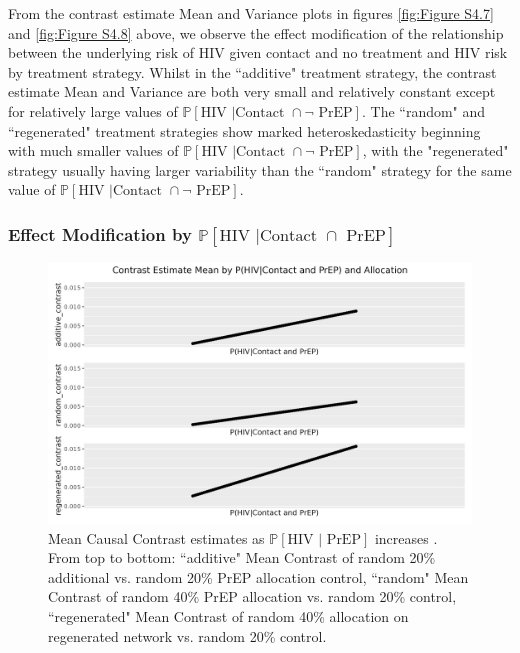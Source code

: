 \documentclass{article}
\theoremstyle{definition}
\begin{document}
From the contrast estimate Mean and Variance plots in figures \ref{fig:Figure S4.7} and \ref{fig:Figure S4.8} above, we observe the effect modification of the relationship between the underlying risk of HIV given contact and no treatment and HIV risk by treatment strategy. Whilst in the ``additive" treatment strategy, the contrast estimate Mean and Variance are both very small and relatively constant except for relatively large values of $\mathbb{P}\left[\text{HIV } \vert \text {Contact } \cap \neg \text{ PrEP}\right]$. The ``random" and ``regenerated" treatment strategies show marked heteroskedasticity beginning with much smaller values of $\mathbb{P}\left[\text{HIV } \vert \text {Contact } \cap \neg \text{ PrEP}\right]$, with the "regenerated" strategy usually having larger variability than the ``random" strategy for the same value of $\mathbb{P}\left[\text{HIV } \vert \text {Contact } \cap \neg \text{ PrEP}\right]$.  
\subsubsection{Effect Modification by \texorpdfstring{$\mathbb{P}\left[\text{HIV } \vert \text {Contact } \cap \text{ PrEP}\right]$}{ℙ[HIV | PrEP]}}
\begin{figure}[H]
    \centering
    \includegraphics[width=\linewidth]{Corrected Figures/p2 Mean plots.png}
    \caption{Mean Causal Contrast estimates as $\mathbb{P}\left[\text{HIV } \vert \text{ PrEP}\right]$ increases . From top to bottom: ``additive" Mean Contrast of random 20\% additional vs. random 20\% PrEP allocation control, ``random" Mean Contrast of random 40\% PrEP allocation vs. random 20\% control, ``regenerated" Mean Contrast of random 40\% allocation on regenerated network vs. random 20\% control.}
    \label{fig:Figure S4.9}

\end{figure}
\end{document}
